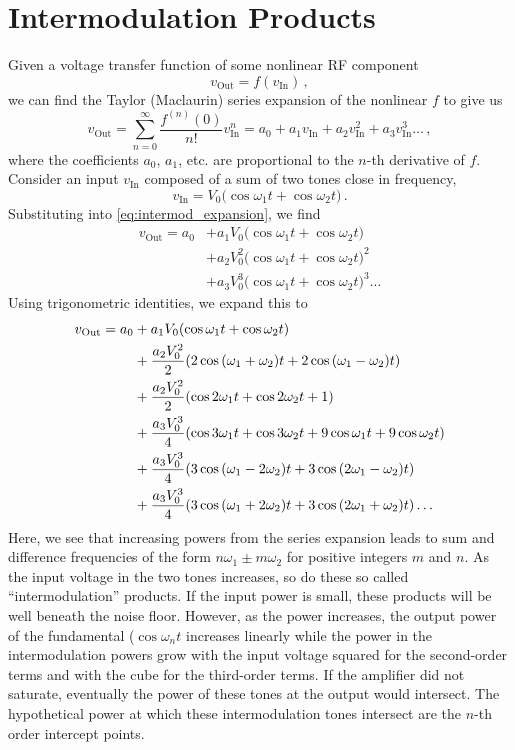 \section{Intermodulation Products} \label{sec:intermod}
Given a voltage transfer function of some nonlinear RF component
\begin{equation}
    v_\text{Out} = f(v_\text{In})\,,
\end{equation}
we can find the Taylor (Maclaurin) series expansion of the nonlinear $f$ to give us
\begin{equation}
    v_\text{Out} = \sum_{n=0}^{\infty}\frac{f^{(n)}(0)}{n!}v_\text{In}^n = a_0 + a_1v_\text{In} + a_2v_\text{In}^2 + a_3v_\text{In}^3 \dots\,,
    \label{eq:intermod_expansion}
\end{equation}
where the coefficients $a_0$, $a_1$, etc. are proportional to the $n$-th derivative of $f$.
Consider an input $v_\text{In}$ composed of a sum of two tones close in frequency,
\begin{equation}
    v_\text{In} = V_0(\cos{\omega_1t} + \cos{\omega_2t)} \,.
\end{equation}
Substituting into \autoref{eq:intermod_expansion}, we find
\begin{align}
    v_\text{Out} = a_0 &+ a_1V_0(\cos{\omega_1t} + \cos{\omega_2t)} \\ &+ a_2V_0^2(\cos{\omega_1t} + \cos{\omega_2t)}^2 \\&+ a_3V_0^3(\cos{\omega_1t} + \cos{\omega_2t)}^3 \dots
\end{align}
Using trigonometric identities, we expand this to
\begin{align}
v_\text{Out} = a_0 &+ a_1V_0(\cos{\omega_1t + \cos{\omega_2t)}} \notag\\
    &+ \frac{a_2V_0^2}{2}(2\cos{(\omega_1+\omega_2)t} + 2\cos{(\omega_1-\omega_2)t}) \notag\\
    &+ \frac{a_2V_0^2}{2}(\cos{2\omega_1t} + \cos{2\omega_2t}  +1 ) \notag\\
    &+ \frac{a_3V_0^3}{4}(
    \cos{3\omega_1t} + 
    \cos{3\omega_2t} + 
    9\cos{\omega_1t} +
    9\cos{\omega_2t}
    ) \notag\\
    &+
    \frac{a_3V_0^3}{4}(
    3\cos{(\omega_1-2\omega_2)t} + 
    3\cos{(2\omega_1-\omega_2)t}) \notag\\
    &+ \frac{a_3V_0^3}{4}(
    3\cos{(\omega_1+2\omega_2)t} +
    3\cos{(2\omega_1+\omega_2)t}) \dots
\end{align}
Here, we see that increasing powers from the series expansion leads to sum and difference frequencies of the form $n\omega_1 \pm m\omega_2$ for positive integers $m$ and $n$.
As the input voltage in the two tones increases, so do these so called ``intermodulation'' products.
If the input power is small, these products will be well beneath the noise floor.
However, as the power increases, the output power of the fundamental ($\cos{\omega_n t}$ increases linearly while the power in the intermodulation powers grow with the input voltage squared for the second-order terms and with the cube for the third-order terms.
If the amplifier did not saturate, eventually the power of these tones at the output would intersect.
The hypothetical power at which these intermodulation tones intersect are the $n$-th order intercept points.

